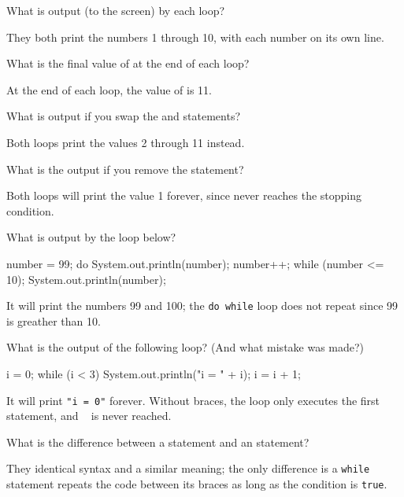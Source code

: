 \Q \label{output}
What is output (to the screen) by each loop?

\begin{answer}
They both print the numbers 1 through 10, with each number on its own line.
\end{answer}


\Q \label{value}
What is the final value of  at the end of each loop?

\begin{answer}
At the end of each loop, the value of  is 11.
\end{answer}


\Q What is output if you swap the  and  statements?

\begin{answer}
Both loops print the values 2 through 11 instead.
\end{answer}


\Q What is the output if you remove the  statement?

\begin{answer}
Both loops will print the value 1 forever, since  never reaches the stopping condition.
\end{answer}


\Q \label{do99}
What is output by the loop below?

\begin{minipage}{0.49\textwidth}
\begin{javalst}
    number = 99;
    do {
        System.out.println(number);
        number++;
    } while (number <= 10);
    System.out.println(number);
\end{javalst}
\end{minipage}
\hfill
\begin{minipage}{0.49\textwidth}
\begin{answer}
It will print the numbers 99 and 100; the \texttt{do while} loop does not repeat since 99 is greather than 10.
\end{answer}
\end{minipage}
\vspace{1ex}


\Q What is the output of the following loop? (And what mistake was made?)

\begin{minipage}{0.49\textwidth}
\begin{javalst}
    i = 0;
    while (i < 3) 
        System.out.println("i = " + i);
        i = i + 1;
\end{javalst}
\end{minipage}
\hfill
\begin{minipage}{0.49\textwidth}
\begin{answer}
It will print \texttt{"i = 0"} forever. Without braces, the loop only executes the first statement, and ~ is never reached.
\end{answer}
\end{minipage}
\vspace{1ex}


\Q What is the difference between a  statement and an  statement?

\begin{answer}
They identical syntax and a similar meaning; the only difference is a \texttt{while} statement repeats the code between its braces as long as the condition is \texttt{true}.
\end{answer}
